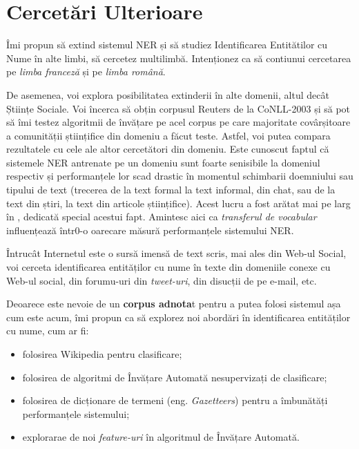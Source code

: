 \section{Cercetări Ulterioare}

Îmi propun să extind sistemul NER și să studiez Identificarea Entitătilor cu Nume în alte limbi, să cercetez multilimbă. Intenționez ca să contiunui cercetarea pe \textit{limba franceză} și pe \textit{limba română}.

De asemenea, voi explora posibilitatea extinderii în alte domenii, altul decât Științe Sociale. Voi încerca să obțin corpusul Reuters de la CoNLL-2003 și să pot să îmi testez algoritmii de învățare pe acel corpus pe care majoritate covârșitoare a comunității științifice din domeniu a făcut teste. Astfel, voi putea compara rezultatele cu cele ale altor cercetători din domeniu. Este cunoscut faptul că sistemele NER antrenate pe un domeniu sunt foarte senisibile la domeniul respectiv și performanțele lor scad drastic în momentul schimbarii doemniului sau tipului de text (trecerea de la text formal la text informal, din chat, sau de la text din știri, la text din articole științifice). Acest lucru a fost arătat mai pe larg în , dedicată special acestui fapt. Amintesc aici ca \textit{transferul de vocabular} influențează într0-o oarecare măsură performanțele sistemului NER.

Întrucât Internetul este o sursă imensă de text scris, mai ales din Web-ul Social, voi cerceta identificarea entităților cu nume în texte din domeniile conexe cu Web-ul social, din forumu-uri din \textit{tweet-uri}, din disucții de pe e-mail, etc.

Deoarece este nevoie de un \textbf{corpus adnota}t pentru a putea folosi sistemul așa cum este acum, îmi propun ca să explorez noi abordări în identificarea entităților cu nume, cum ar fi:

\begin{itemize}
\item folosirea Wikipedia pentru clasificare;
\item folosirea de algoritmi de Învățare Automată nesupervizați de clasificare;
\item folosirea de dicționare de termeni (eng. \textit{Gazetteers}) pentru a îmbunătăți performanțele sistemului;
\item explorarae de noi \textit{feature-uri} în algoritmul de Învățare Automată.
\end{itemize}

